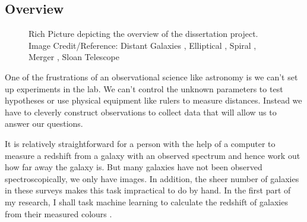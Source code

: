 \subsection{Overview}
\begin{figure}[H]
	\centering
	\caption{Rich Picture depicting the overview of the dissertation project. Image Credit/Reference: Distant Galaxies \parencite{nasa_hubblesite:_2004}, Elliptical \parencite{nasa_hubble_2016}, Spiral \parencite{nasa/jpl_milky_2019}, Merger \parencite{evan_gough_artists_2019}, Sloan Telescope \parencite{ieee_computer_society_digital_liibrary_ieee_1999}}
\end{figure}
One of the frustrations of an observational science like astronomy is we can't set up experiments in the lab. We can't control the unknown parameters to test hypotheses or use physical equipment like rulers to measure distances. Instead we have to cleverly construct observations to collect data that will allow us to answer our questions.

It is relatively straightforward for a person with the help of a computer to measure a redshift from a galaxy with an observed spectrum and hence work out how far away the galaxy is. But many galaxies have not been observed spectroscopically, we only have images. In addition, the sheer number of galaxies in these surveys makes this task impractical to do by hand.  In the first part of my research, I shall task machine learning to calculate the redshift of galaxies from their measured colours .

